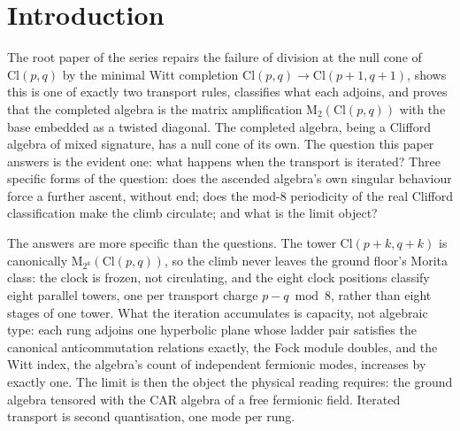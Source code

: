 \documentclass[11pt]{article}
\theoremstyle{definition}
\theoremstyle{plain}
\providecommand{\Cl}{}\renewcommand{\Cl}{\mathrm{Cl}}
\providecommand{\Mat}{}\renewcommand{\Mat}{\mathrm{M}}
\begin{document}
\noindent{}
\newpage

\section{Introduction}

\label{c:note.tower.setting-introduction}
The root paper of the series \cite{ButlerT1} repairs the failure of division at the null cone of $\Cl(p,q)$ by the minimal Witt completion $\Cl(p,q) \to \Cl(p{+}1,q{+}1)$, shows this is one of exactly two transport rules, classifies what each adjoins, and proves that the completed algebra is the matrix amplification $\Mat_2(\Cl(p,q))$ with the base embedded as a twisted diagonal. The completed algebra, being a Clifford algebra of mixed signature, has a null cone of its own. The question this paper answers is the evident one: what happens when the transport is iterated? Three specific forms of the question: does the ascended algebra's own singular behaviour force a further ascent, without end; does the mod-8 periodicity of the real Clifford classification make the climb circulate; and what is the limit object?

The answers are more specific than the questions. The tower $\Cl(p{+}k,q{+}k)$ is canonically $\Mat_{2^k}(\Cl(p,q))$, so the climb never leaves the ground floor's Morita class: the clock is frozen, not circulating, and the eight clock positions classify eight parallel towers, one per transport charge $p - q \bmod 8$, rather than eight stages of one tower. What the iteration accumulates is capacity, not algebraic type: each rung adjoins one hyperbolic plane whose ladder pair satisfies the canonical anticommutation relations exactly, the Fock module doubles, and the Witt index, the algebra's count of independent fermionic modes, increases by exactly one. The limit is then the object the physical reading requires: the ground algebra tensored with the CAR algebra of a free fermionic field. Iterated transport is second quantisation, one mode per rung.
\end{document}
